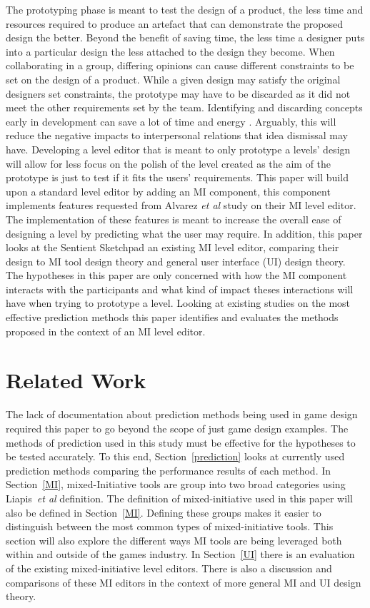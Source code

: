 \documentclass[journal]{IEEEtran}
\begin{document}
The prototyping phase is meant to test the design of a product, the less time and resources required to produce an artefact that can demonstrate the proposed design the better. Beyond the benefit of saving time, the less time a designer puts into a particular design the less attached to the design they become. When collaborating in a group, differing opinions can cause different constraints to be set on the design of a product. While a given design may satisfy the original designers set constraints, the prototype may have to be discarded as it did not meet the other requirements set by the team. Identifying and discarding concepts early in development can save a lot of time and energy \cite[p.489]{stempfle1999thinking}. Arguably, this will reduce the negative impacts to interpersonal relations that idea dismissal may have. Developing a level editor that is meant to only prototype a levels' design will allow for less focus on the polish of the level created as the aim of the prototype is just to test if it fits the users' requirements. This paper will build upon a standard level editor by adding an MI component, this component implements features requested from Alvarez \textit{et al}\cite{alvarez2018fostering} study on their MI level editor. The implementation of these features is meant to increase the overall ease of designing a level by predicting what the user may require. In addition, this paper looks at the Sentient Sketchpad\cite{liapis2013sentient} an existing MI level editor, comparing their design to MI tool design theory and general user interface (UI) design theory. The hypotheses in this paper are only concerned with how the MI component interacts with the participants and what kind of impact theses interactions will have when trying to prototype a level. Looking at existing studies on the most effective prediction methods \cite{shepperd2001comparing,mendes2002further, wen2012systematic} this paper identifies and evaluates the methods proposed in the context of an MI level editor.

\section{Related Work}
The lack of documentation about prediction methods being used in game design required this paper to go beyond the scope of just game design examples. The methods of prediction used in this study must be effective for the hypotheses to be tested accurately. To this end, Section~\ref{prediction} looks at currently used prediction methods comparing the performance results of each method. In Section~\ref{MI}, mixed-Initiative tools are group into two broad categories using Liapis~\textit{et al}\cite{liapis2016mixed} definition. The definition of mixed-initiative used in this paper will also be defined in Section~\ref{MI}. Defining these groups makes it easier to distinguish between the most common types of mixed-initiative tools. This section will also explore the different ways MI tools are being leveraged both within and outside of the games industry. In Section~\ref{UI} there is an evaluation of the existing mixed-initiative level editors. There is also a discussion and comparisons of these MI editors in the context of more general MI and UI design theory.
\end{document}

